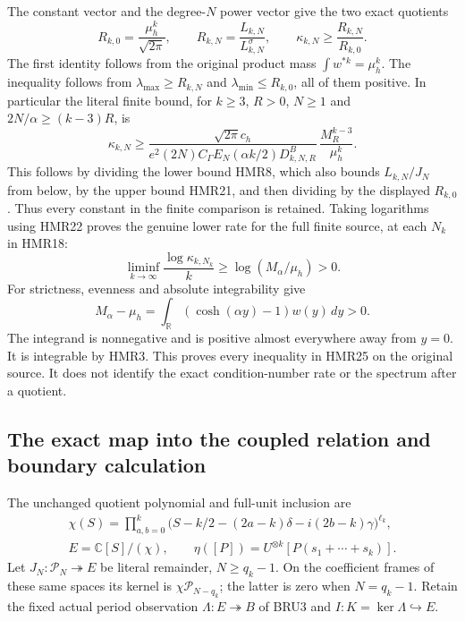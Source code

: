 \documentclass[11pt,a4paper]{article}
\begin{document}
The constant vector and the degree-$N$ power vector give
the two exact quotients
\[
 R_{k,0}=\frac{\mu_h^k}{\sqrt{2\pi}},\qquad
 R_{k,N}=\frac{L_{k,N}}{L^\sigma_{k,N}},\qquad
 \kappa_{k,N}\geq\frac{R_{k,N}}{R_{k,0}}.
 \tag{HMR24}
\]
The first identity follows from the original product mass
$\int w^{*k}=\mu_h^k$. The inequality follows from
$\lambda_{\max}\geq R_{k,N}$ and
$\lambda_{\min}\leq R_{k,0}$, all of them positive.
In particular the literal finite bound, for $k\geq3$,
$R>0$, $N\geq1$ and $2N/\alpha\geq(k-3)R$, is
\[
 \boxed{\displaystyle
 \kappa_{k,N}\geq
 \frac{\sqrt{2\pi}c_h}
 {e^2(2N)C_\Gamma E_N(\alpha k/2)D_{k,N,R}^{B}}\,
 \frac{M_R^{k-3}}{\mu_h^k}.}
 \tag{HMR24a}
\]
This follows by dividing the lower bound HMR8,
which also bounds $L_{k,N}/J_N$ from below,
by the upper bound HMR21, and then dividing by
the displayed $R_{k,0}$. Thus every constant
in the finite comparison is retained.
Taking logarithms using HMR22 proves the genuine lower
rate for the full finite source, at each $N_k$ in HMR18:
\[
 \boxed{\displaystyle
 \liminf_{k\to\infty}\frac{\log\kappa_{k,N_k}}{k}
 \geq \log(M_\alpha/\mu_h)>0.}
 \tag{HMR25}
\]
For strictness, evenness and absolute integrability give
\[
 M_\alpha-\mu_h
 =\int_{\mathbb R}(\cosh(\alpha y)-1)w(y)\,dy>0.
 \tag{HMR26}
\]
The integrand is nonnegative and is positive almost
everywhere away from $y=0$. It is integrable by HMR3.
This proves every inequality in HMR25 on the original
source. It does not identify the exact condition-number
rate or the spectrum after a quotient.

\subsection{The exact map into the coupled relation and boundary calculation}

The unchanged quotient polynomial and full-unit inclusion are
\[
 \begin{gathered}
 \chi(S)=\prod_{a,b=0}^k
 \bigl(S-k/2-(2a-k)\delta-i(2b-k)\gamma\bigr)^{\ell_k},\\
 E=\mathbb C[S]/(\chi),\qquad
 \eta([P])=U^{\otimes k}[P(s_1+\cdots+s_k)].
 \end{gathered}\tag{HMR27}
\]
Let $J_N:\mathcal P_N\twoheadrightarrow E$ be literal
remainder, $N\geq q_k-1$. On the coefficient frames
of these same spaces its kernel is
$\chi\mathcal P_{N-q_k}$; the latter is zero when
$N=q_k-1$. Retain the fixed actual period observation
$\Lambda:E\twoheadrightarrow B$ of BRU3 and
$I:K=\ker\Lambda\hookrightarrow E$.
\end{document}
